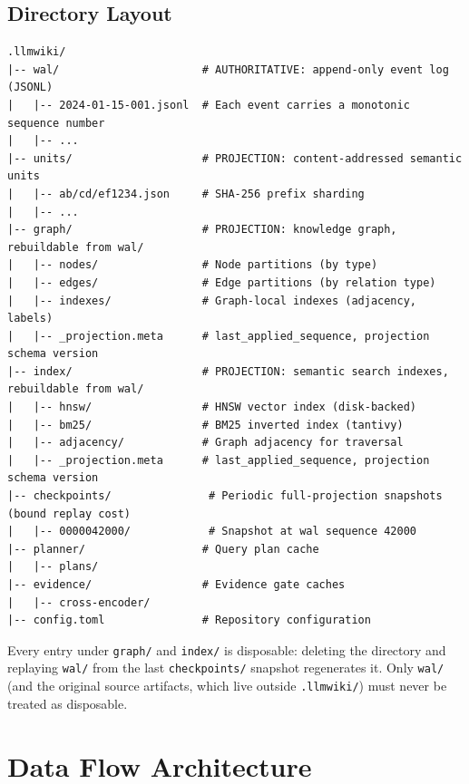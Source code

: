 \subsection{Directory Layout}
\label{sec:arch:fs-layout}

\begin{verbatim}
.llmwiki/
|-- wal/                      # AUTHORITATIVE: append-only event log (JSONL)
|   |-- 2024-01-15-001.jsonl  # Each event carries a monotonic sequence number
|   |-- ...
|-- units/                    # PROJECTION: content-addressed semantic units
|   |-- ab/cd/ef1234.json     # SHA-256 prefix sharding
|   |-- ...
|-- graph/                    # PROJECTION: knowledge graph, rebuildable from wal/
|   |-- nodes/                # Node partitions (by type)
|   |-- edges/                # Edge partitions (by relation type)
|   |-- indexes/              # Graph-local indexes (adjacency, labels)
|   |-- _projection.meta      # last_applied_sequence, projection schema version
|-- index/                    # PROJECTION: semantic search indexes, rebuildable from wal/
|   |-- hnsw/                 # HNSW vector index (disk-backed)
|   |-- bm25/                 # BM25 inverted index (tantivy)
|   |-- adjacency/            # Graph adjacency for traversal
|   |-- _projection.meta      # last_applied_sequence, projection schema version
|-- checkpoints/               # Periodic full-projection snapshots (bound replay cost)
|   |-- 0000042000/            # Snapshot at wal sequence 42000
|-- planner/                  # Query plan cache
|   |-- plans/
|-- evidence/                 # Evidence gate caches
|   |-- cross-encoder/
|-- config.toml               # Repository configuration
\end{verbatim}

Every entry under \texttt{graph/} and \texttt{index/} is disposable: deleting the directory and replaying \texttt{wal/} from the last \texttt{checkpoints/} snapshot regenerates it. Only \texttt{wal/} (and the original source artifacts, which live outside \texttt{.llmwiki/}) must never be treated as disposable.

\section{Data Flow Architecture}
\label{sec:architecture:dataflow}

